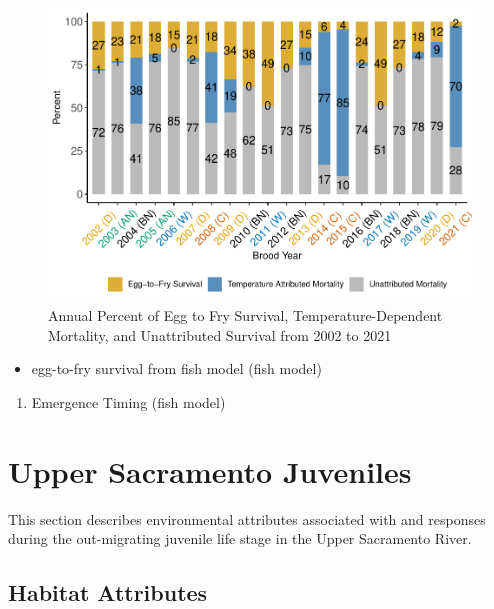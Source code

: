 \documentclass[
]{book}
\providecommand{\tightlist}{%
  \setlength{\itemsep}{0pt}\setlength{\parskip}{0pt}}
\theoremstyle{definition}
\theoremstyle{definition}
\theoremstyle{definition}
\theoremstyle{definition}
\theoremstyle{remark}
\begin{document}
\begin{figure}
\centering
\includegraphics{_main_files/figure-latex/TDM-etf-fig-1.pdf}
\caption{\label{fig:TDM-etf-fig}Annual Percent of Egg to Fry Survival, Temperature-Dependent Mortality, and Unattributed Survival from 2002 to 2021}
\end{figure}

\begin{itemize}
\tightlist
\item
  egg-to-fry survival from fish model (fish model)
\end{itemize}

\begin{enumerate}
\def\labelenumi{\arabic{enumi}.}
\setcounter{enumi}{2}
\tightlist
\item
  Emergence Timing (fish model)
\end{enumerate}

\hypertarget{upper-sacramento-juveniles}{%
\chapter{Upper Sacramento Juveniles}\label{upper-sacramento-juveniles}}

This section describes environmental attributes associated with and responses during the out-migrating juvenile life stage in the Upper Sacramento River.

\hypertarget{habitat-attributes-2}{%
\section{Habitat Attributes}\label{habitat-attributes-2}}
\end{document}
